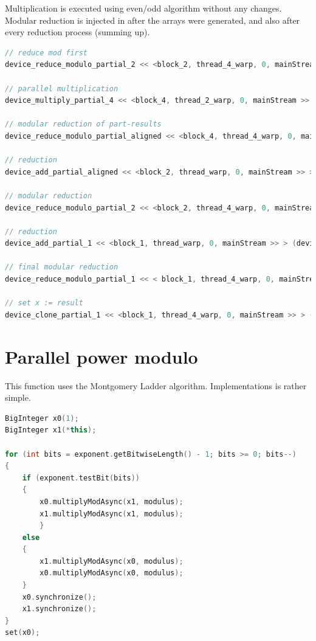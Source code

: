 \documentclass[oneside,openright,12pt,final,en]{mgr}
\begin{document}
Multiplication is executed using even/odd algorithm without any changes. 
Modular reduction is injected in after the arrays were generated, and also after every reduction process (summing up).

\begin{lstlisting}[language=cpp]
// reduce mod first
device_reduce_modulo_partial_2 << <block_2, thread_4_warp, 0, mainStream >> > (device_x, deviceArray, device_m);

// parallel multiplication
device_multiply_partial_4 << <block_4, thread_2_warp, 0, mainStream >> > (device4arrays, device_x, deviceArray);

// modular reduction of part-results
device_reduce_modulo_partial_aligned << <block_4, thread_4_warp, 0, mainStream >> > (device4arrays, device_m);

// reduction
device_add_partial_aligned << <block_2, thread_warp, 0, mainStream >> > (device4arrays, device4arrays + 256);

// modular reduction
device_reduce_modulo_partial_2 << <block_2, thread_4_warp, 0, mainStream >> > (device4arrays, device4arrays + 128, device_m);

// reduction
device_add_partial_1 << <block_1, thread_warp, 0, mainStream >> > (device4arrays, device4arrays + 128);

// final modular reduction
device_reduce_modulo_partial_1 << < block_1, thread_4_warp, 0, mainStream >> > (device4arrays, device_m);

// set x := result
device_clone_partial_1 << <block_1, thread_4_warp, 0, mainStream >> > (device_x, device4arrays);
\end{lstlisting}

\section{Parallel power modulo}

This function uses the Montgomery Ladder algorithm. Implementations is rather simple. 


\begin{lstlisting}[language=cpp]
BigInteger x0(1);
BigInteger x1(*this);	

for (int bits = exponent.getBitwiseLength() - 1; bits >= 0; bits--)
{
	if (exponent.testBit(bits))
	{
		x0.multiplyModAsync(x1, modulus);
		x1.multiplyModAsync(x1, modulus);
		}
	else
	{
		x1.multiplyModAsync(x0, modulus);
		x0.multiplyModAsync(x0, modulus);
	}			
	x0.synchronize();
	x1.synchronize();		
}
set(x0);
\end{lstlisting}
\end{document}
